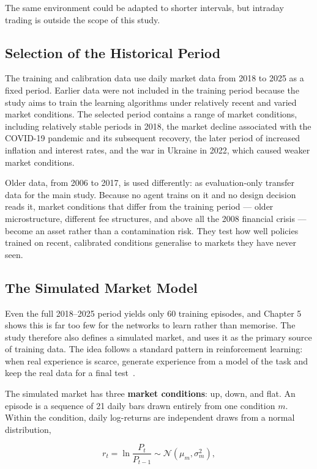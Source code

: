 The same environment could be adapted to shorter intervals, but intraday
trading is outside the scope of this study.

\subsection{Selection of the Historical Period}

The training and calibration data use daily market data from 2018 to
2025 as a fixed period. Earlier data were not included in the training
period because the study aims to train the learning algorithms under
relatively recent and varied market conditions. The selected period
contains a range of market conditions, including relatively stable
periods in 2018, the market decline associated with the COVID-19
pandemic and its subsequent recovery, the later period of increased
inflation and interest rates, and the war in Ukraine in 2022, which
caused weaker market conditions.

Older data, from 2006 to 2017, is used differently: as evaluation-only
transfer data for the main study. Because no agent trains on it and no
design decision reads it, market conditions that differ from the
training period --- older microstructure, different fee structures, and
above all the 2008 financial crisis --- become an asset rather than a
contamination risk. They test how well policies trained on recent,
calibrated conditions generalise to markets they have never seen.

\subsection{The Simulated Market Model}

Even the full 2018--2025 period yields only 60 training episodes, and
Chapter 5 shows this is far too few for the networks to learn rather
than memorise. The study therefore also defines a simulated market, and
uses it as the primary source of training data. The idea follows a
standard pattern in reinforcement learning: when real experience is
scarce, generate experience from a model of the task and keep the real
data for a final test~\cite{silver2016}.

The simulated market has three \textbf{market conditions}: up, down, and
flat. An episode is a sequence of 21 daily bars drawn entirely from one
condition \(m\). Within the condition, daily log-returns are independent
draws from a normal distribution,

\[r_{t} = \ln\frac{P_{t}}{P_{t - 1}} \sim \mathcal{N}\left( \mu_{m},\sigma_{m}^{2} \right),\]

